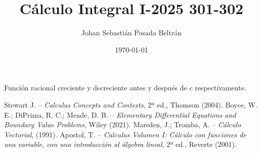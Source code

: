 \documentclass{article}
\title{Cálculo Integral I-2025 301-302}
\author{Johan Sebastián Posada Beltrán}
\date{\today}
\begin{document}
\maketitle









Función racional creciente y decreciente antes y después de $c$ respectivamente.

\begin{thebibliography}{9}
     Stewart J. -- \emph{Calculus Concepts and Contexts}, 2ª ed., Thomson (2004).
     Boyce, W. E.; DiPrima, R. C.; Meade, D. B. -- \emph{Elementary Differential Equations and Boundary Value Problems}, Wiley (2021).
     Marsden, J.; Tromba, A. -- \emph{Cálculo Vectorial}, (1991).
     Apostol, T. -- \emph{Calculus Volumen I: Cálculo con funciones de una variable, con una introducción al álgebra lineal}, 2ª ed., Reverte (2001).
\end{thebibliography}
\end{document}
